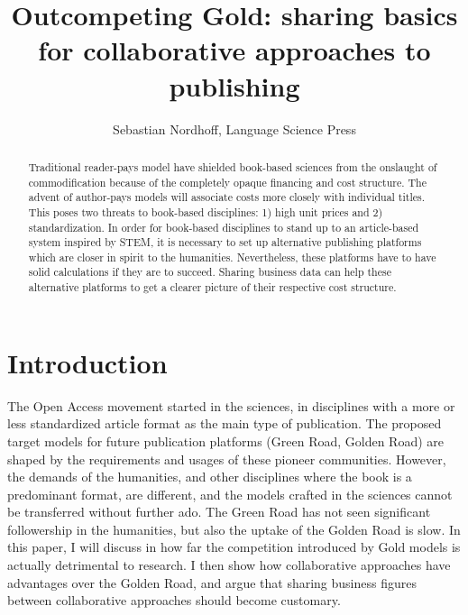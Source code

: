 \documentclass[12pt]{article}
\title{Outcompeting Gold: sharing basics for collaborative approaches to publishing}
\author{Sebastian Nordhoff, Language Science Press}
\date{}
\begin{document}
\maketitle

\begin{abstract}
Traditional reader-pays model have shielded book-based sciences from the onslaught of commodification because of the completely opaque financing and cost structure. 
The advent of author-pays models will associate costs more closely with individual titles. This poses two threats to book-based disciplines:
1) high unit prices and  
2) standardization. In order for book-based disciplines to stand up to an article-based system inspired by STEM, it is necessary to set up alternative publishing platforms which are closer in spirit to the humanities. Nevertheless, these platforms have to have solid calculations if they are to succeed. Sharing business data can help these alternative platforms to get a clearer picture of their respective cost structure. 
\end{abstract}

\section{Introduction}
The Open Access movement started in the sciences, in disciplines with a more or less standardized article format as the main type of publication. The proposed target models for future publication platforms (Green Road, Golden Road) are shaped by the requirements and usages of these pioneer communities. However, the demands of the humanities, and other disciplines where the book is a predominant format, are different, and the models crafted in the sciences cannot be transferred without further ado. The Green Road has not seen significant followership in the humanities, but also the uptake of the Golden Road is slow. In this paper, I will discuss in how far the competition introduced by Gold models is actually detrimental to research. I then show how collaborative approaches have advantages over the Golden Road, and argue that sharing business figures between collaborative approaches should become customary. 
\end{document}

